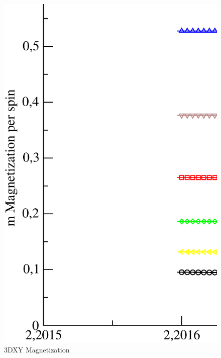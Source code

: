 \begin{figure}[!htpb]
  \centering
  \includegraphics[width=\textwidth]{./plots/3DXY/vsT/Magnetization.eps}
  \caption{3DXY Magnetization}
\end{figure}

